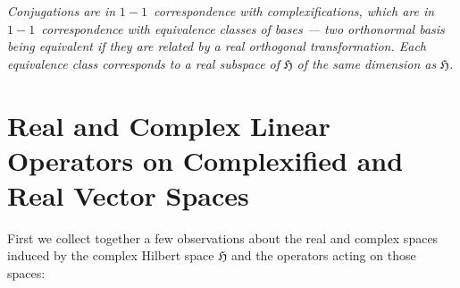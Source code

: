 \documentclass[aps,preprint]{revtex4}
\begin{document}
\emph{Conjugations are in }$1-1$\emph{\ correspondence with
complexifications, which are in }$1-1$\emph{\ correspondence with
equivalence classes of bases --- two orthonormal basis being equivalent if
they are related by a real orthogonal transformation. Each equivalence class
corresponds to a real subspace of }$\mathfrak{H}$ \emph{of the same
dimension as} $\mathfrak{H}$\emph{.}

\section{Real and Complex Linear Operators on Complexified and Real Vector
Spaces}

First we collect together a few observations about the real and complex
spaces induced by the complex Hilbert space $\mathfrak{H}$ and the operators
acting on those spaces:
\end{document}
